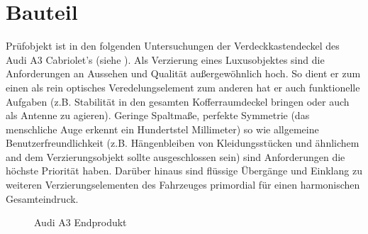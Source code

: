 \documentclass[12pt,a4paper,parskip]{scrartcl}
\begin{document}
  
\newpage
\section{Bauteil}
Prüfobjekt ist in den folgenden Untersuchungen der Verdeckkastendeckel  des Audi A3 Cabriolet's (siehe ).
 Als Verzierung eines Luxusobjektes sind die Anforderungen an Aussehen und Qualität außergewöhnlich hoch. So dient er zum einen als rein optisches Veredelungselement zum anderen hat er auch funktionelle Aufgaben (z.B. Stabilität in den gesamten Kofferraumdeckel bringen oder auch als Antenne zu agieren). Geringe Spaltmaße,  perfekte Symmetrie (das menschliche Auge erkennt ein Hundertstel Millimeter) so wie allgemeine Benutzerfreundlichkeit (z.B. Hängenbleiben von Kleidungsstücken und ähnlichem and dem Verzierungsobjekt sollte ausgeschlossen sein) sind Anforderungen die höchste Priorität haben.
 Darüber hinaus sind  flüssige Übergänge und Einklang   zu weiteren Verzierungselementen des Fahrzeuges primordial für einen harmonischen Gesamteindruck.
 
   
\begin{figure}[!htb]
\centering
\hfill
{}
\hfill
{}
\hfill
\caption[Audi A3 Endprodukt]{Audi A3 Endprodukt\footnotemark }
\label{fig:audia3}
\end{figure}
\end{document}
